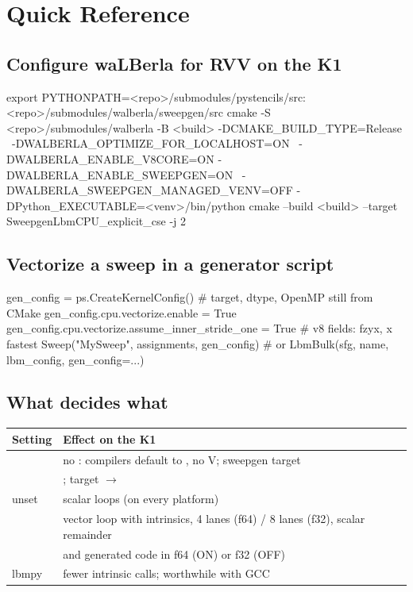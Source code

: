 \chapter{Quick Reference}\label{r02:app:quick-reference}

\section*{Configure waLBerla for RVV on the K1}
\begin{shcode}
export PYTHONPATH=<repo>/submodules/pystencils/src:<repo>/submodules/walberla/sweepgen/src
cmake -S <repo>/submodules/walberla -B <build> -DCMAKE_BUILD_TYPE=Release \
      -DWALBERLA_OPTIMIZE_FOR_LOCALHOST=ON \
      -DWALBERLA_ENABLE_V8CORE=ON -DWALBERLA_ENABLE_SWEEPGEN=ON \
      -DWALBERLA_SWEEPGEN_MANAGED_VENV=OFF -DPython_EXECUTABLE=<venv>/bin/python
cmake --build <build> --target SweepgenLbmCPU_explicit_cse -j 2
\end{shcode}

\section*{Vectorize a sweep in a generator script}
\begin{pycode}
gen_config = ps.CreateKernelConfig()          # target, dtype, OpenMP still from CMake
gen_config.cpu.vectorize.enable = True
gen_config.cpu.vectorize.assume_inner_stride_one = True   # v8 fields: fzyx, x fastest
Sweep("MySweep", assignments, gen_config)     # or LbmBulk(sfg, name, lbm_config, gen_config=...)
\end{pycode}

\section*{What decides what}
\begin{center}\small
\begin{tabularx}{\linewidth}{@{}>{\raggedright\arraybackslash}p{5.2cm}>{\raggedright\arraybackslash}X@{}}
  \toprule
  \textbf{Setting} & \textbf{Effect on the K1}\\
  \midrule
  \cmakeopt{WALBERLA_OPTIMIZE_FOR_LOCALHOST=OFF} & no \code{-march}: compilers default to
    \code{rv64gc}, no V; sweepgen target \code{GenericCPU}\\
  \cmakeopt{WALBERLA_OPTIMIZE_FOR_LOCALHOST=ON} & \code{-march=rv64gcv_zvl256b}; target
    \code{CurrentCPU} $\rightarrow$ \code{RISCV_RVV}\\
  \code{cpu.vectorize.enable} unset & scalar loops (on every platform)\\
  \code{cpu.vectorize.enable = True} & vector loop with \code{__riscv_*} intrinsics, 4
    lanes (f64) / 8 lanes (f32), scalar remainder\\
  \cmakeopt{WALBERLA_DOUBLE_ACCURACY} & \code{real_t} and generated code in f64 (ON) or
    f32 (OFF)\\
  lbmpy \code{cse_global=True} & fewer intrinsic calls; worthwhile with GCC\\
  \bottomrule
\end{tabularx}
\end{center}

